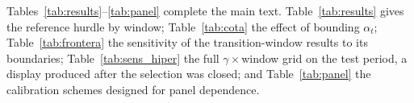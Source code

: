 Tables~\ref{tab:results}--\ref{tab:panel} complete the main text. Table~\ref{tab:results} gives the reference hurdle by window; Table~\ref{tab:cota} the effect of bounding $\alpha_t$; Table~\ref{tab:frontera} the sensitivity of the transition-window results to its boundaries; Table~\ref{tab:sens_hiper} the full $\gamma\times$window grid on the test period, a display produced after the selection was closed; and Table~\ref{tab:panel} the calibration schemes designed for panel dependence.






